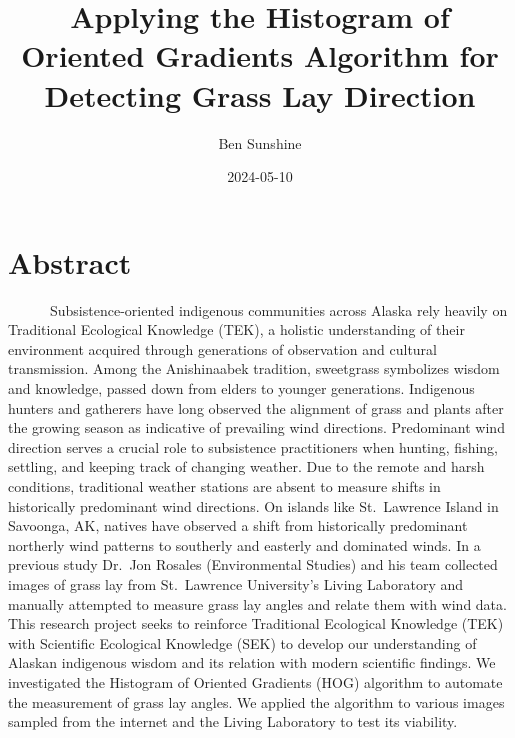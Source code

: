 \documentclass[
  letterpaper,
]{report}
\title{Applying the Histogram of Oriented Gradients Algorithm for
Detecting Grass Lay Direction}
\author{Ben Sunshine}
\date{2024-05-10}
\renewcommand*\contentsname{Table of contents}
\newcommand\contentsname{Table of contents}
\begin{document}
\maketitle
\ifdefined\Shaded\renewenvironment{Shaded}{\begin{tcolorbox}[enhanced, sharp corners, interior hidden, breakable, frame hidden, boxrule=0pt, borderline west={3pt}{0pt}{shadecolor}]}{\end{tcolorbox}}\fi

\renewcommand*\contentsname{Table of contents}
{
\hypersetup{linkcolor=}
\setcounter{tocdepth}{2}
\tableofcontents
}

\hypertarget{abstract}{%
\chapter{Abstract}\label{abstract}}

~~~~~~Subsistence-oriented indigenous communities across Alaska rely
heavily on Traditional Ecological Knowledge (TEK), a holistic
understanding of their environment acquired through generations of
observation and cultural transmission. Among the Anishinaabek tradition,
sweetgrass symbolizes wisdom and knowledge, passed down from elders to
younger generations. Indigenous hunters and gatherers have long observed
the alignment of grass and plants after the growing season as indicative
of prevailing wind directions. Predominant wind direction serves a
crucial role to subsistence practitioners when hunting, fishing,
settling, and keeping track of changing weather. Due to the remote and
harsh conditions, traditional weather stations are absent to measure
shifts in historically predominant wind directions. On islands like
St.~Lawrence Island in Savoonga, AK, natives have observed a shift from
historically predominant northerly wind patterns to southerly and
easterly and dominated winds. In a previous study Dr.~Jon Rosales
(Environmental Studies) and his team collected images of grass lay from
St.~Lawrence University's Living Laboratory and manually attempted to
measure grass lay angles and relate them with wind data. This research
project seeks to reinforce Traditional Ecological Knowledge (TEK) with
Scientific Ecological Knowledge (SEK) to develop our understanding of
Alaskan indigenous wisdom and its relation with modern scientific
findings. We investigated the Histogram of Oriented Gradients (HOG)
algorithm to automate the measurement of grass lay angles. We applied
the algorithm to various images sampled from the internet and the Living
Laboratory to test its viability.
\end{document}
